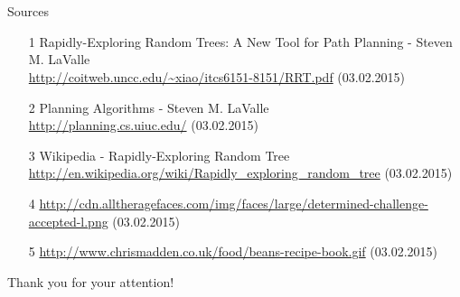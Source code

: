 \documentclass[%
  professionalfonts,%
  xcolor={%
    usenames,%
    dvipsnames,%
    svgnames,%
    table,%
    hyperref%
  }%
]{beamer}
\begin{document}
\section{}
\begin{frame}{Sources}
	\begin{itemize}
		\item[1] Rapidly-Exploring Random Trees: A New Tool for Path Planning - Steven M. LaValle
		\\\url{http://coitweb.uncc.edu/~xiao/itcs6151-8151/RRT.pdf} (03.02.2015)
		\item[2] Planning Algorithms - Steven M. LaValle
		\\\url{http://planning.cs.uiuc.edu/} (03.02.2015)
		\item[3] Wikipedia - Rapidly-Exploring Random Tree
		\\\url{http://en.wikipedia.org/wiki/Rapidly_exploring_random_tree} (03.02.2015)
    \item[4] \url{http://cdn.alltheragefaces.com/img/faces/large/determined-challenge-accepted-l.png} (03.02.2015)
    \item[5] \url{http://www.chrismadden.co.uk/food/beans-recipe-book.gif} (03.02.2015)
	\end{itemize}
\end{frame}

\begin{frame}
	\centering\Huge{Thank you for your attention!}
\end{frame}
\end{document}
